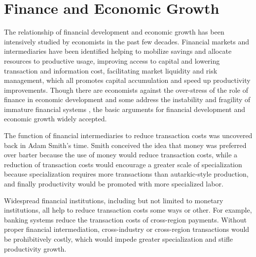 \documentclass[AER]{AEA}
\begin{document}


\section{Finance and Economic Growth}
\label{sec:theory}

The relationship of financial development and economic growth has been
intensively studied by economists in the past few decades. Financial markets and
intermediaries have been identified helping to mobilize savings and allocate
resources to productive usage, improving access to capital and lowering
transaction and information cost, facilitating market liquidity and risk
management, which all promotes capital accumulation and speed up productivity
improvements. Though there are economists against the over-stress of the role of
finance in economic development \citep{lucas1998} and some address the
instability and fragility of immature financial systems \citep{stiglitz2000},
the basic arguments for financial development and economic growth widely accepted. 

The function of financial intermediaries to reduce transaction costs was
uncovered back in Adam Smith's time. Smith conceived the idea that money was
preferred over barter because the use of money would reduce transaction costs,
while a reduction of transaction costs would encourage a greater scale of
specialization because specialization requires more transactions than
autarkic-style production, and finally productivity would be promoted with more
specialized labor.

Widespread financial institutions, including but not limited to monetary institutions, all help to reduce transaction costs some ways or other. 
For example, banking systems reduce the transaction costs of cross-region payments. 
Without proper financial intermediation, cross-industry or cross-region transactions 
would be prohibitively costly, which would impede greater specialization and stifle
productivity growth. 
\end{document}
